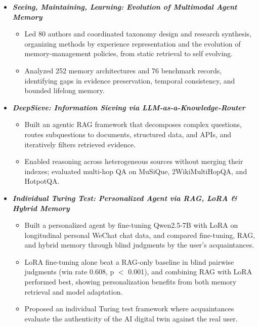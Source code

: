 \documentclass[11pt,letterpaper]{article}
\begin{document}
\begin{itemize}[leftmargin=1em]
    \item \emph{\textbf{Seeing, Maintaining, Learning: Evolution of Multimodal Agent Memory}}
    \begin{itemize}[leftmargin=1.3em,itemsep=0.05em,topsep=0.15em]
        \item Led 80 authors and coordinated taxonomy design and research synthesis, organizing methods by experience representation and the evolution of memory-management policies, from static retrieval to self evolving.
        \item Analyzed 252 memory architectures and 76 benchmark records, identifying gaps in evidence preservation, temporal consistency, and bounded lifelong memory.
    \end{itemize}

    \item \emph{\textbf{DeepSieve: Information Sieving via LLM-as-a-Knowledge-Router}}
    \begin{itemize}[leftmargin=1.3em,itemsep=0.05em,topsep=0.15em]
        \item Built an agentic RAG framework that decomposes complex questions, routes subquestions to documents, structured data, and APIs, and iteratively filters retrieved evidence.
        \item Enabled reasoning across heterogeneous sources without merging their indexes; evaluated multi-hop QA on MuSiQue, 2WikiMultiHopQA, and HotpotQA.
    \end{itemize}

    \item \emph{\textbf{Individual Turing Test: Personalized Agent via RAG, LoRA \& Hybrid Memory}}
    \begin{itemize}[leftmargin=1.3em,itemsep=0.05em,topsep=0.15em]
        \item Built a personalized agent by fine-tuning Qwen2.5-7B with LoRA on longitudinal personal WeChat chat data, and compared fine-tuning, RAG, and hybrid memory through blind judgments by the user's acquaintances.
        \item LoRA fine-tuning alone beat a RAG-only baseline in blind pairwise judgments (win rate 0.608, p $<$ 0.001), and combining RAG with LoRA performed best, showing personalization benefits from both memory retrieval and model adaptation.
        \item Proposed an individual Turing test framework where acquaintances evaluate the authenticity of the AI digital twin against the real user.
    \end{itemize}


\end{itemize}
\end{document}
